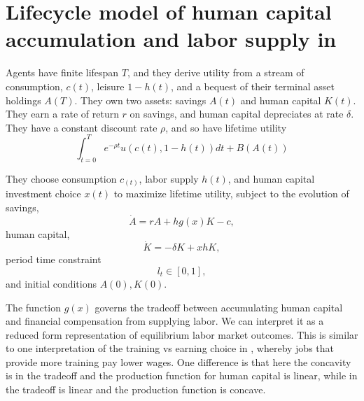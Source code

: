 \documentclass[12pt]{article}
\begin{document}
\fi

\section{Lifecycle model of human capital accumulation and labor supply in \textcite{blinder_weiss_1976_lifecycle_human_capital_labor_supply_synthesis}}
Agents have finite lifespan $T$, and they derive utility from a stream of consumption, $c(t)$, leisure $1 - h(t)$, and a bequest of their terminal asset holdings $A(T)$.
They own two assets: savings $A(t)$ and human capital $K(t)$.
They earn a rate of return $r$ on savings, and human capital depreciates at rate $\delta$.
They have a constant discount rate $\rho$, and so have lifetime utility
\begin{equation}
    \int_{t = 0}^{T} e^{-\rho t} u(c(t), 1-h(t)) dt + B(A(t))
\end{equation}

They choose consumption $c_(t)$, labor supply $h(t)$, and human capital investment choice $x(t)$ to maximize lifetime utility, subject to the evolution of savings,
\begin{equation}
    \dot{A} = r A + h g(x) K - c,
\end{equation}
human capital,
\begin{equation}
    \dot{K} = -\delta K + x h K,
\end{equation}
period time constraint
\begin{equation}
    l_t \in [0,1],
\end{equation}
and initial conditions $A(0), K(0)$.

The function $g(x)$ governs the tradeoff between accumulating human capital and financial compensation from supplying labor. 
We can interpret it as a reduced form representation of equilibrium labor market outcomes.
This is similar to one interpretation of the training vs earning choice in \textcite{ben-porath_1976_human_capital_lifecycle_earnings}, whereby jobs that provide more training pay lower wages.
One difference is that here the concavity is in the tradeoff and the production function for human capital is linear, while in \textcite{ben-porath_1976_human_capital_lifecycle_earnings} the tradeoff is linear and the production function is concave.
\end{document}
